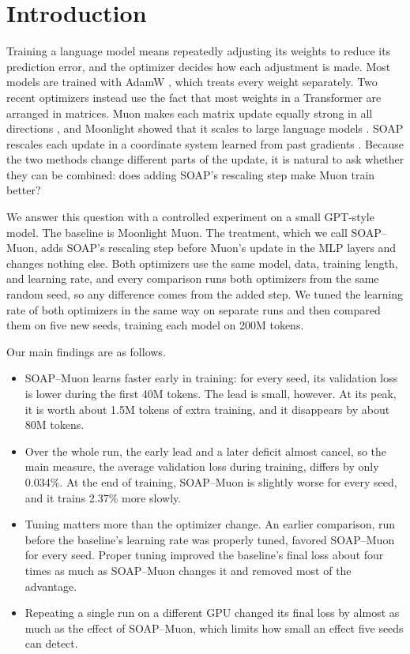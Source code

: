 \section{Introduction}

Training a language model means repeatedly adjusting its weights to reduce its
prediction error, and the optimizer decides how each adjustment is made. Most
models are trained with AdamW \cite{kingma2015adam,loshchilov2019adamw}, which
treats every weight separately. Two recent optimizers instead use the fact that
most weights in a Transformer \cite{vaswani2017attention} are arranged in
matrices. Muon makes each matrix update equally strong in all directions
\cite{jordan2024muon}, and Moonlight showed that it scales to large language
models \cite{liu2025muon}. SOAP rescales each update in a coordinate system
learned from past gradients \cite{gupta2018shampoo,vyas2025soap}. Because the
two methods change different parts of the update, it is natural to ask whether
they can be combined: does adding SOAP's rescaling step make Muon train better?

We answer this question with a controlled experiment on a small GPT-style
model. The baseline is Moonlight Muon. The treatment, which we call
SOAP--Muon, adds SOAP's rescaling step before Muon's update in the MLP layers
and changes nothing else. Both optimizers use the same model, data, training
length, and learning rate, and every comparison runs both optimizers from the
same random seed, so any difference comes from the added step. We tuned the
learning rate of both optimizers in the same way on separate runs and then
compared them on five new seeds, training each model on 200M tokens.

Our main findings are as follows.
\begin{itemize}
\item SOAP--Muon learns faster early in training: for every seed, its
  validation loss is lower during the first 40M tokens. The lead is small,
  however. At its peak, it is worth about 1.5M tokens of extra training, and it
  disappears by about 80M tokens.
\item Over the whole run, the early lead and a later deficit almost cancel, so
  the main measure, the average validation loss during training, differs by
  only 0.034\%. At the end of training, SOAP--Muon is slightly worse for every
  seed, and it trains 2.37\% more slowly.
\item Tuning matters more than the optimizer change. An earlier comparison, run
  before the baseline's learning rate was properly tuned, favored SOAP--Muon
  for every seed. Proper tuning improved the baseline's final loss about four
  times as much as SOAP--Muon changes it and removed most of the advantage.
\item Repeating a single run on a different GPU changed its final loss by
  almost as much as the effect of SOAP--Muon, which limits how small an effect
  five seeds can detect.
\end{itemize}

